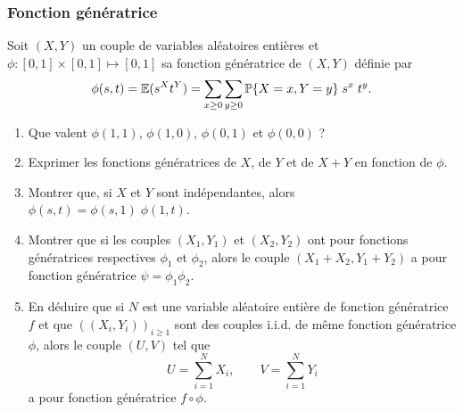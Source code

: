 \subsubsection{Fonction génératrice}

Soit $(X, Y)$ un couple de variables aléatoires entières et $\phi: [0, 1] \times [0, 1] \mapsto [0, 1]$ sa fonction génératrice de $(X, Y)$ définie par 
$$
\phi(s, t) = \operatorname{\mathbb{E}}(s^X t^Y) = \sum_{x \geq 0} \sum_{y \geq 0} \operatorname{\mathbb{P}}\{X=x, Y=y\} \; s^x \; t^y.
$$
\begin{enumerate}
  \item Que valent $\phi(1, 1)$, $\phi(1, 0)$, $\phi(0, 1)$ et $\phi(0, 0)$ ?
  \solution{\todo{}}   
  \item Exprimer les fonctions génératrices de $X$, de $Y$ et de $X+Y$ en fonction de $\phi$.
  \solution{\todo{}}   
  \item Montrer que, si $X$ et $Y$ sont indépendantes, alors $\phi(s, t) = \phi(s, 1) \; \phi(1, t)$.
  \item Montrer que si les couples $(X_1, Y_1)$ et $(X_2, Y_2)$ ont pour fonctions génératrices respectives $\phi_1$ et $\phi_2$, alors le couple $(X_1+X_2, Y_1+Y_2)$ a pour fonction génératrice $\psi = \phi_1 \phi_2$. 
  \solution{\todo{}}   
  \item En déduire que si $N$ est une variable aléatoire entière de fonction génératrice $f$ et que $((X_i, Y_i))_{i \geq 1}$ sont des couples i.i.d. de même fonction génératrice $\phi$, alors le couple $(U, V)$ tel que
  $$
  U = \sum_{i=1}^N X_i, \qquad V = \sum_{i=1}^N Y_i
  $$
  a pour fonction génératrice $f \circ \phi$.
  \solution{\todo{}}   
\end{enumerate}

